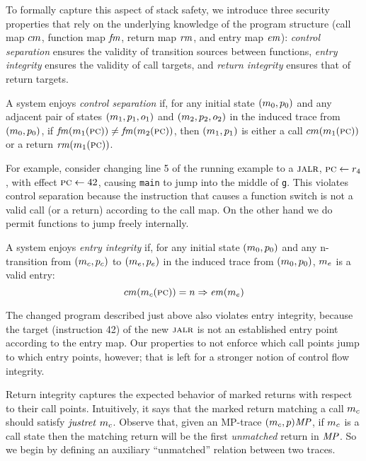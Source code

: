 \documentclass[acmsmall,review,anonymous]{acmart}\settopmatter{printfolios=true,printccs=false,printacmref=false}
\begin{document}
{To formally capture this aspect of stack safety, we introduce three
security properties that rely on the underlying knowledge of the
program structure (call map $cm$, function map $\mathit{fm}$, return map $\mathit{rm}$, and entry
map $\mathit{em}$): {\em control separation} ensures the validity of transition
sources between functions, {\em entry integrity} ensures the validity
of call targets, and {\em return integrity} ensures that of
return targets.

A system enjoys {\em control separation}
if, for any initial state \((m_0, p_0)\) and any adjacent pair of states
\((m_1,p_1,o_1)\) and \((m_2,p_2,o_2)\)
in the induced trace from \((m_0,p_0)\),
if \(\mathit{fm}(m_1(\textsc{pc})) \not = \mathit{fm}(m_2(\textsc{pc}))\),
then \((m_1,p_1)\) is either a call \(cm(m_1(\textsc{pc}))\)
or a return \(\mathit{rm}(m_1(\textsc{pc}))\).

\smallskip

For example, consider changing line 5 of the running example to a $\textsc{jalr}$,
$\textsc{pc} \leftarrow r_4$, with effect $\textsc{pc} \leftarrow 42$, causing {\tt main}
to jump into the middle of {\tt g}.
This violates control separation because the instruction that causes a
function switch is not a valid call (or a return) according to the
call map. On the other hand we do permit functions to jump freely internally.

A system enjoys {\em entry integrity}
if, for any initial state \((m_0, p_0)\)
and any n-transition from \((m_c,p_c)\) to
\((m_e, p_e)\) in the induced trace from
\((m_0,p_0)\), $m_e$ is a valid entry:
\[cm(m_c(\textsc{pc})) = n \Rightarrow \mathit{em}(m_e)\]

The changed program described just above also violates entry integrity,
because the target (instruction 42) of the new $\textsc{jalr}$ is not an established
entry point according to the entry map. Our properties to not enforce which
call points jump to which entry points, however; that is left for a stronger
notion of control flow integrity.

\newcommand*{\Unmatched}{\mathit{um}}

Return integrity captures the expected behavior of marked returns with
respect to their call points. Intuitively, it says that the marked return
matching a call $m_c$ should satisfy $\mathit{justret}\ m_c$.
Observe that, given an MP-trace $(m_c,p)\mathit{MP}$, if $m_c$ is
a call state then the matching return will be the first \emph{unmatched} return
in $\mathit{MP}$. So we begin by defining an auxiliary ``unmatched'' relation between
two traces.

}
\end{document}
